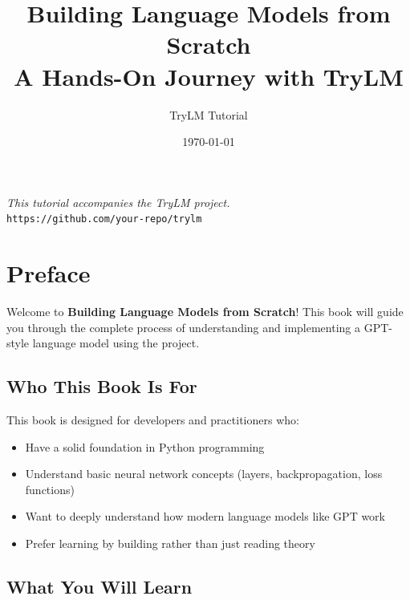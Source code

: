 \documentclass[11pt,a4paper,openany]{book}
\title{
    \textbf{Building Language Models from Scratch} \\[0.5em]
    \Large A Hands-On Journey with TryLM
}
\author{TryLM Tutorial}
\date{\today}
\begin{document}

\frontmatter

\maketitle

\thispagestyle{empty}
\vspace*{\fill}
\begin{center}
    \textit{This tutorial accompanies the TryLM project.}\\[1em]
    \texttt{https://github.com/your-repo/trylm}
\end{center}
\vspace*{\fill}
\newpage

\tableofcontents

\chapter*{Preface}

Welcome to \textbf{Building Language Models from Scratch}! This book will guide you through the complete process of understanding and implementing a GPT-style language model using the \TryLM project.

\section*{Who This Book Is For}

This book is designed for developers and practitioners who:
\begin{itemize}
    \item Have a solid foundation in Python programming
    \item Understand basic neural network concepts (layers, backpropagation, loss functions)
    \item Want to deeply understand how modern language models like GPT work
    \item Prefer learning by building rather than just reading theory
\end{itemize}

\section*{What You Will Learn}
\end{document}
